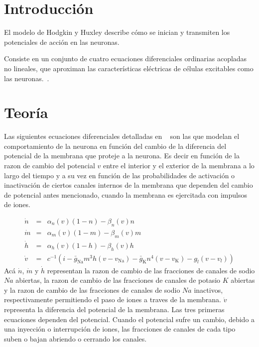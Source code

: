 \documentclass[aps,prl,twocolumn,groupedaddress]{revtex4-2}
\begin{document}
\section{Introducción}

El modelo de Hodgkin y Huxley describe cómo se inician y transmiten los potenciales de acción en las neuronas.

Consiste en un conjunto de cuatro ecuaciones diferenciales ordinarias acopladas no lineales, que aproximan las características eléctricas de células excitables como las neuronas.~\cite{HodgkinyHuxleyWikipedia}.

\section{Teoría}

Las siguientes ecuaciones diferenciales
detalladas en ~\cite{HodgkinyHuxleyWikipedia} 
son las que modelan el comportamiento de la neurona en función del cambio de la diferencia del potencial de la membrana que proteje a la neurona. Es decir en función de la razon de cambio del potencial $v$ entre el interior y el exterior de la membrana a lo largo del tiempo y a su vez en función de las probabilidades de activación o inactivación de ciertos canales internos de la membrana  que dependen del cambio de potencial antes mencionado, cuando la membrana es ejercitada con impulsos de iones.

\begin{eqnarray*}
\dot{n}&=&\alpha_n(v)(1-n)-\beta_n(v) n\\
\dot{m}&=&\alpha_m(v)(1-m)-\beta_m(v) m\\
\dot{h}&=&\alpha_h(v)(1-h)-\beta_h(v) h\\
\dot{v}&=&c^{-1}(i-\bar{g}_{\mathrm{Na}}m^3h(v-v_{\mathrm{Na}})-\bar{g}_{\mathrm{K}}n^4(v-v_{\mathrm{K}})-g_{l}(v-v_{l}))
\end{eqnarray*}
Acá $\dot{n}$, $\dot{m}$ y $\dot{h}$
representan la razon de cambio de las fracciones de canales de sodio  $Na$ abiertas, la razon de cambio de las fracciones de canales de potasio $K$ abiertas y la razon de cambio de las fracciones de canales de sodio $Na$ inactivos, respectivamente permitiendo el paso de iones a traves de la membrana. $\dot{v}$ representa la diferencia del potencial de la membrana.
Las tres primeras ecuaciones dependen del potencial. Cuando el potencial sufre un cambio, debido a una inyección o interrupción de iones, las fracciones de canales de cada tipo suben o bajan abriendo o cerrando los canales.
\end{document}
